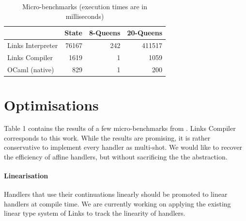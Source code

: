 \documentclass[preprint,numbers]{sigplanconf}
\newcommand{\msgbox}[2]{{%
  \par\noindent\small\color{red}%
  \framebox{\parbox{\dimexpr\linewidth-2\fboxsep-2\fboxrule}{\textbf{#1:} #2}}%
}}
\newcommand{\kc}[1]{\msgbox{KC}{#1}}
\begin{document}

\begin{table}
  \centering
  \begin{tabular}{| r | r | r | r |}
    \cline{2-4}
    \multicolumn{1}{c|}{~} & \multicolumn{1}{c|}{State} & \multicolumn{1}{c|}{8-Queens} & \multicolumn{1}{c|}{20-Queens}   \\
    \hline
    \multicolumn{1}{|l|}{Links Interpreter} &  76167&     242  &     411517  \\
    \hline
    \multicolumn{1}{|l|}{Links Compiler}    &  1619 &        1 &      1059  \\
    \hline
    \multicolumn{1}{|l|}{OCaml (native)}    &  829  &        1 &       200  \\
    \hline
  \end{tabular}\caption{Micro-benchmarks (execution times are in milliseconds)}\label{tbl:benchmarks}
\end{table}

\section{Optimisations}

Table 1 contains the results of a few micro-benchmarks from
\citet{Kammar2013}. Links Compiler corresponds to this work. While the
results are promising, it is rather conservative to implement every
handler as multi-shot. We would like to recover the efficiency of
affine handlers, but without sacrificing the the abstraction.

\paragraph{Linearisation}
Handlers that use their continuations linearly should be promoted to
linear handlers at compile time. We are currently working on applying
the existing linear type system of Links to track the linearity of
handlers.
\end{document}
